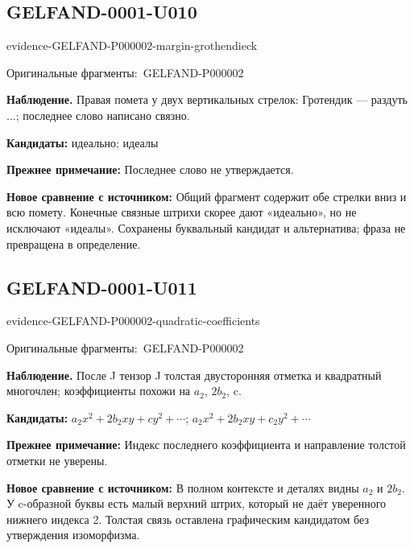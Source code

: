 \documentclass[11pt]{article}
\newcommand{\EvidenceBlock}[4]{%
 \par\smallskip\noindent\begin{minipage}{\linewidth}
 \begin{minipage}[t]{.47\linewidth}\vspace{0pt}\centering
 \csname evidence-#1-#2\endcsname\par
 {\scriptsize\SourceCropCaption\ #1}\par
 \end{minipage}\hfill
 \begin{minipage}[t]{.49\linewidth}\vspace{0pt}\raggedright
 {\small\color{orange!65!black}\textbf{#4} #3}\par
 \end{minipage}
 \end{minipage}\par\smallskip}
\newcommand{\SourceCropCaption}{Оригинальные фрагменты:}\newcommand{\ReadingCaption}{Сомнительное чтение.}\newcommand{\IncompleteCaption}{Неразобранный фрагмент.}\newcommand{\DiagramCaption}{Рисунок и набранное описание.}
\begin{document}
\subsection*{GELFAND-0001-U010}
\EvidenceBlock{GELFAND-P000002}{margin-grothendieck}{Правая помета у двух вертикальных стрелок: Гротендик — раздуть ...; последнее слово написано связно.}{Наблюдение.}
\par\smallskip\noindent\textbf{Кандидаты: } идеально; идеалы\par
\par\smallskip\noindent\textbf{Прежнее примечание: } Последнее слово не утверждается.\par
\par\smallskip\noindent\textbf{Новое сравнение с источником: } Общий фрагмент содержит обе стрелки вниз и всю помету. Конечные связные штрихи скорее дают «идеально», но не исключают «идеалы». Сохранены буквальный кандидат и альтернатива; фраза не превращена в определение.\par

\subsection*{GELFAND-0001-U011}
\EvidenceBlock{GELFAND-P000002}{quadratic-coefficients}{После J тензор J толстая двусторонняя отметка и квадратный многочлен; коэффициенты похожи на \(a_2\), \(2b_2\), c.}{Наблюдение.}
\par\smallskip\noindent\textbf{Кандидаты: } \(a_2x^2+2b_2xy+cy^2+\cdots\); \(a_2x^2+2b_2xy+c_2y^2+\cdots\)\par
\par\smallskip\noindent\textbf{Прежнее примечание: } Индекс последнего коэффициента и направление толстой отметки не уверены.\par
\par\smallskip\noindent\textbf{Новое сравнение с источником: } В полном контексте и деталях видны \(a_2\) и \(2b_2\). У c-образной буквы есть малый верхний штрих, который не даёт уверенного нижнего индекса 2. Толстая связь оставлена графическим кандидатом без утверждения изоморфизма.\par
\end{document}
